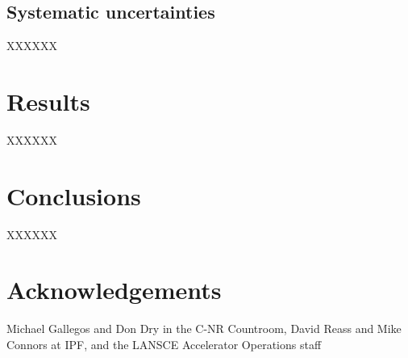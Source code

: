 \documentclass[3p]{elsarticle}
\begin{document}
\subsection{Systematic uncertainties}

XXXXXX




\section{Results}


XXXXXX

          




 
 
 
 \section{Conclusions}

XXXXXX


 
 \section{Acknowledgements}
 
 
 Michael Gallegos and Don Dry in the C-NR Countroom, David Reass and Mike Connors at IPF, and the LANSCE Accelerator Operations staff 
 
%  
\end{document}
